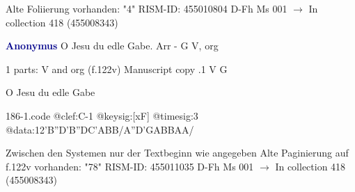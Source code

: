 \documentclass[twocolumn]{book}
\begin{document}
\newline Alte Foliierung vorhanden: "4"
\newline RISM-ID: 455010804
\newline D-Fh  Ms 001
\newline $\rightarrow$ In collection 418 (455008343)
      
\newline \par \vspace{7pt} \textcolor{darkblue}{\textbf{Anonymus  }}
\newline O Jesu du edle Gabe. Arr - G
\newline V, org
\newline \begin{itshape}\end{itshape} 
\newline \textcolor{darkblue}{}  1 parts: V and org  (f.122v)
\newline Manuscript copy
.1  V  G
\newline \begin{footnotesize} O Jesu du edle Gabe \end{footnotesize}  
\begin{filecontents*}{186-1.code}
@clef:C-1
@keysig:[xF]
@timesig:3
@data:12'B''D'B''DC'ABB/A''D'GABBAA/
\end{filecontents*}
\newline
%

\newline Zwischen den Systemen nur der Textbeginn wie angegeben
\newline Alte Paginierung auf f.122v vorhanden: "78"
\newline RISM-ID: 455011035
\newline D-Fh  Ms 001
\newline $\rightarrow$ In collection 418 (455008343)
      
\end{document}
